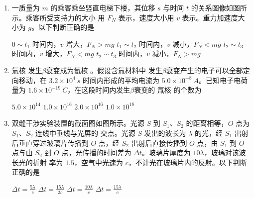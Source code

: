 


\gaokaoxz


\begin{enumerate}
\item
一质量为 $ m $ 的乘客乘坐竖直电梯下楼，其位移 $ s $ 与时间 $ t $ 的关系图像如图所示。乘客所受支持力的大小
用 $ F_{N} $ 表示，速度大小用 $ v $ 表示。重力加速度大小为 $ g $。以下判断正确的是  
\begin{figure}[h!]
\centering

\end{figure}


\fourchoices
{$ 0 \sim t_{1} $ 时间内，$ v $ 增大，$ F_{N} >mg $}
{$ t_{1} \sim t_{2} $ 时间内，$ v $ 减小，$ F_{N} <mg $}
{$ t_{2} \sim t_{3} $ 时间内，$ v $ 增大，$ F_{N} <mg $}
{$ t_{2} \sim t_{3} $ 时间内，$ v $ 减小，$ F_{N} >mg $}





\item
氚核  发生$ \beta $衰变成为氦核  。假设含氚材料中  发生$ \beta $衰变产生的电子可以全部定向移动，在 $ 3.2 \times 10^{4} \ s $ 时间内形成的平均电流为 $ 5.0 \times 10^{-8} \ A $。已知电子电荷量为 $ 1.6 \times 10^{-19} \ C $，在这段时间内发生$ \beta $衰变的
氚核  的个数为  

\fourchoices
{$5.0 \times 10^{14}$}
{$1.0 \times 10^{16}$}
{$ 2.0 \times 10^{16}$}
{$1.0 \times 10^{18}$}






\item
双缝干涉实验装置的截面图如图所示。光源 $ S $ 到 $ S_{1} $、$ S_{2} $ 的距离相等，$ O $ 点为 $ S_{1} $、$ S_{2} $ 连线中垂线与光屏的
交点。光源 $ S $ 发出的波长为 $ \lambda $ 的光，经 $ S_{1} $ 出射后垂直穿过玻璃片传播到 $ O $ 点，经 $ S_{2} $ 出射后直接传播到
$ O $ 点，由 $ S_{1} $ 到 $ O $ 点与由 $ S_{2} $ 到 $ O $ 点，光传播的时间差为 $ \Delta t $。玻璃片厚度为 $ 10\lambda $，玻璃对该波长光的折射
率为 $ 1.5 $，空气中光速为 $ c $，不计光在玻璃片内的反射。以下判断正确的是  
\begin{figure}[h!]
\centering

\end{figure}


\fourchoices
{$\Delta t=\frac{5 \lambda}{c}$}
{$ \Delta t=\frac{15 \lambda}{2 c}$}
{$ \Delta t=\frac{10 \lambda}{c}$}
{$ \Delta t=\frac{15 \lambda}{c}$}






\end{enumerate}
